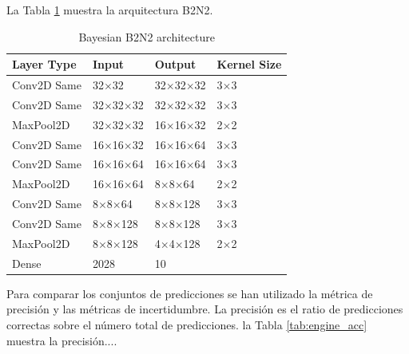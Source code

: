 La Tabla \ref{tab:b2n2_model} muestra la arquitectura B2N2. 

\begin{table}[h]
    \centering
    \caption{Bayesian B2N2 architecture}
    \label{tab:b2n2_model}
    \begin{tabular}{llll}
    \hline
    \textbf{Layer Type} & \textbf{Input} & \textbf{Output} & \textbf{Kernel Size}\\ \hline
    Conv2D Same & 32$\times$32 & 32$\times$32$\times$32 & 3$\times$3 \\
    Conv2D Same & 32$\times$32$\times$32 & 32$\times$32$\times$32 & 3$\times$3 \\
    MaxPool2D & 32$\times$32$\times$32 & 16$\times$16$\times$32 & 2$\times$2 \\
    Conv2D Same & 16$\times$16$\times$32 & 16$\times$16$\times$64 & 3$\times$3 \\
    Conv2D Same & 16$\times$16$\times$64 & 16$\times$16$\times$64 & 3$\times$3 \\
    MaxPool2D & 16$\times$16$\times$64 & 8$\times$8$\times$64 & 2$\times$2 \\
    Conv2D Same & 8$\times$8$\times$64 & 8$\times$8$\times$128 & 3$\times$3 \\
    Conv2D Same & 8$\times$8$\times$128 & 8$\times$8$\times$128 & 3$\times$3 \\
    MaxPool2D & 8$\times$8$\times$128 & 4$\times$4$\times$128 & 2$\times$2 \\
    Dense & 2028 & 10 & \\ \hline
    \end{tabular}
\end{table}

Para comparar los conjuntos de predicciones se han utilizado la métrica de precisión y las métricas de incertidumbre. La precisión es el ratio de predicciones correctas sobre el número total de predicciones. la Tabla \ref{tab:engine_acc} muestra la precisión...\todo . 

